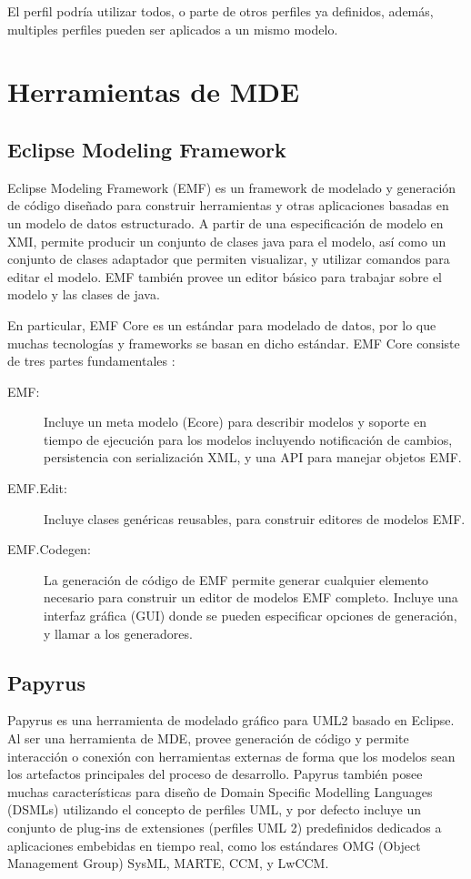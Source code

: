 El perfil podría utilizar todos, o parte de otros perfiles ya definidos, además, multiples perfiles pueden ser aplicados a un mismo modelo.

\section{Herramientas de MDE}
\subsection{Eclipse Modeling Framework}
Eclipse Modeling Framework (EMF) es un framework de modelado y generación de código diseñado para construir herramientas y otras aplicaciones basadas en un modelo de datos estructurado.  
A partir de una especificación de modelo en XMI, permite producir un conjunto de clases java para el modelo, así como un conjunto de clases adaptador que permiten visualizar, y utilizar comandos para editar el modelo. EMF también provee un editor básico para trabajar sobre el modelo y las clases de java.

En particular, EMF Core es un estándar para modelado de datos, por lo que muchas tecnologías y frameworks se basan en dicho estándar. 
EMF Core consiste de tres partes fundamentales \cite{steinberg2008emf}:
\begin{description}
\item[EMF:] Incluye un meta modelo (Ecore) para describir modelos y soporte en tiempo de ejecución para los modelos incluyendo notificación de cambios, persistencia con serialización XML, y una API para manejar objetos EMF.

\item[EMF.Edit:] Incluye clases genéricas reusables, para construir editores de modelos EMF.

\item[EMF.Codegen:] La generación de código de EMF permite generar cualquier elemento necesario para construir un editor de modelos EMF completo. Incluye una interfaz gráfica (GUI) donde se pueden especificar opciones de generación, y llamar a los generadores.
\end{description}

\subsection{Papyrus}
Papyrus es una herramienta de modelado gráfico para UML2 basado en Eclipse. Al ser una herramienta de MDE, provee generación de código y permite interacción o conexión con herramientas externas de forma que los modelos sean los artefactos principales del proceso de desarrollo.
Papyrus también posee muchas características para diseño de Domain Specific Modelling Languages (DSMLs) utilizando el concepto de perfiles UML, y por defecto incluye un conjunto de plug-ins de extensiones (perfiles UML 2) predefinidos dedicados a aplicaciones embebidas en tiempo real, como los estándares OMG (Object Management Group) SysML, MARTE, CCM, y LwCCM.

